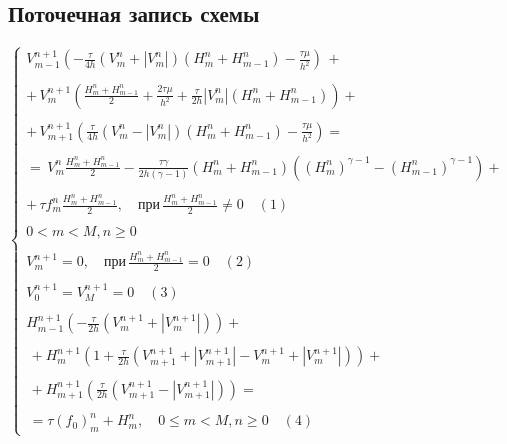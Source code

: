 \documentclass[12pt]{article}
\begin{document}
\subsection{Поточечная запись схемы}
$
  \left \{
    \begin{array}{l}
      V_{m-1}^{n+1} (-\frac{\tau}{4h} (V_{m}^{n} + |V_{m}^{n}|) (H_{m}^{n} + H_{m - 1} ^{n}) - \frac {\tau \mu} {h^{2}}) \, + \\ \\ 
      + \,V_{m}^{n + 1} (\frac{H_{m}^{n} + H_{m - 1} ^ {n}}{2} + \frac{2 \tau \mu} {h^{2}} + \frac{\tau}{2h} |V_{m}^{n}|(H_{m}^{n} + H_{m -  1} ^ {n})) +\\ \\
      + \,V_{m+1}^{n+1} (\frac {\tau}{4h} (V_{m}^{n} - |V_{m}^{n}|) (H_{m}^{n} + H_{m-1}^{n}) - \frac{\tau \mu} {h^{2}})  = \\   \\
      =\, V_{m}^{n} \frac{H_{m}^{n} + H_{m - 1}^{n}} {2} - \frac {\tau \gamma}{2h (\gamma - 1)} (H_{m}^{n} + H_{m - 1}^{n}) ((H_{m}^{n})^{\gamma - 1} - 
      (H_{m - 1}^{n})^{\gamma - 1}) +  \\ \\ 
      + \,\tau f_{m}^{n} \frac{H_{m}^{n} + H_{m-1}^{n}}{2}, \quad \text{при} \, \frac{H_{m}^{n} + H_{m - 1}^{n}}{2} \neq 0 \quad (1) \\ \\
      0<m<M, n \geq 0 \\ \\
      V_{m}^{n+1} = 0, \quad \text{при} \, \frac{H_{m}^{n} + H_{m - 1}^{n}}{2} = 0 \quad (2)\\ \\
      V_{0}^{n+1} = V_{M}^{n+1} = 0 \quad(3) \\ \\ 
      H_{m-1}^{n+1} (-\frac{\tau}{2h} (V_{m}^{n+1} + |V_{m}^{n+1}|))  + \\ \\
      \, + H_{m}^{n+1} (1 + \frac{\tau} {2h} (V_{m+1}^{n+1} + |V_{m+1}^{n+1}| - V_{m}^{n+1} + |V_{m}^{n+1}|)) +\\ \\
      \, + H_{m+1}^{n+1} (\frac{\tau}{2h} (V_{m+1}^{n+1} - |V_{m+1}^{n+1}|)) =\\ \\
      \, = \tau (f_{0})^{n}_{m} + H_{m}^{n},  \quad 0 \leq m<M, n \geq 0 \quad (4)
    \end{array}  
  \right .
$
\end{document}
